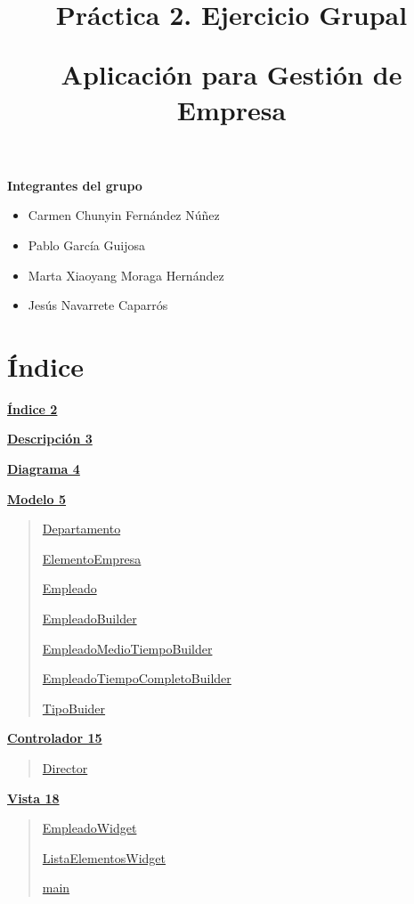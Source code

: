 \documentclass[
]{article}
\title{\phantomsection\label{_m3fsboosfdtx}{}

\phantomsection\label{_gbgxfwdo0k7x}{}Práctica 2. Ejercicio Grupal

\phantomsection\label{_xror403oixh4}{}Aplicación para Gestión de
Empresa}
\author{}
\date{}
\begin{document}
\maketitle

\textbf{Integrantes del grupo}

\begin{itemize}
\item
  Carmen Chunyin Fernández Núñez
\item
  Pablo García Guijosa
\item
  Marta Xiaoyang Moraga Hernández
\item
  Jesús Navarrete Caparrós
\end{itemize}
 \pagebreak
\section{Índice}\label{uxedndice}

\hyperref[uxedndice]{\textbf{Índice 2}}

\hyperref[descripciuxf3n]{\textbf{Descripción 3}}

\hyperref[diagrama]{\textbf{Diagrama 4}}

\hyperref[modelo]{\textbf{Modelo 5}}

\begin{quote}
\hyperref[departamento]{Departamento}

\hyperref[elementoempresa]{ElementoEmpresa}

\hyperref[empleado]{Empleado}

\hyperref[empleadobuilder]{EmpleadoBuilder}

\hyperref[empleadomediotiempobuilder]{EmpleadoMedioTiempoBuilder}

\hyperref[empleadotiempocompletobuilder]{EmpleadoTiempoCompletoBuilder}

\hyperref[tipobuider]{TipoBuider}
\end{quote}

\hyperref[controlador]{\textbf{Controlador 15}}

\begin{quote}
\hyperref[director]{Director}
\end{quote}

\hyperref[vista]{\textbf{Vista 18}}

\begin{quote}
\hyperref[empleadowidget]{EmpleadoWidget}

\hyperref[listaelementoswidget]{ListaElementosWidget}

\hyperref[main]{main}
\end{quote}
\end{document}
